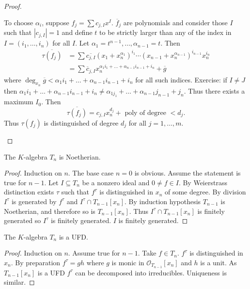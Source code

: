 \documentclass[a4paper]{article}
\renewcommand*{\O}{\mathcal{O}}
\begin{document}
\begin{proof}
\begin{enumerate}
    To choose \(\alpha_i\), suppose \(f_j = \sum c_{j, I} x^I\). \(\overline f_j\) are polynomials and consider those \(I\) such that \(|c_{j, I}| = 1\) and define \(t\) to be strictly larger than any of the index in \(I = (i_1, \dots, i_n)\) for all \(I\). Let \(\alpha_1 = t^{n - 1}, \dots, \alpha_{n - 1} = t\). Then
    \begin{align*}
      \overline{\tau(f_j)}
      &= \sum \overline{c_{j, I}} (x_1 + x_n^{\alpha_1})^{i_1} \cdots (x_{n - 1} + x_n^{\alpha_{n - 1}})^{i_{n - 1}} x_n^{i_n} \\
      &= \sum \overline c_{j, I} x_n^{\alpha_1 i_1 + \dots + \alpha_{n - 1}i_{n - 1} + i_n} + \overline g
    \end{align*}
    where \(\deg_{x_n} \overline g < \alpha_1i_1 + \dots + \alpha_{n - 1} i_{n - 1} + i_n\) for all such indices. Exercise: if \(I \ne J\) then \(\alpha_1i_1 + \dots + \alpha_{n - 1}i_{n - 1} + i_n \ne \alpha_{1 j_1} + \dots + \alpha_{n - 1} j_{n - 1} + j_n\). Thus there exists a maximum \(I_0\). Then
    \[
      \overline{\tau(f_j)} = c_{j, I} x_n^{d_j} + \text{ poly of degree } < d_j.
    \]
    Thus \(\tau(f_j)\) is distinguished of degree \(d_j\) for all \(j = 1, \dots, m\).
  \end{enumerate}
\end{proof}

\begin{proposition}
  The \(K\)-algebra \(T_n\) is Noetherian.
\end{proposition}

\begin{proof}
  Induction on \(n\). The base case \(n = 0\) is obvious. Assume the statement is true for \(n - 1\). Let \(I \subseteq T_n\) be a nonzero ideal and \(0 \ne f \in I\). By Weierstrass distinction exists \(\tau\) such that \(f^\tau\) is distinguished in \(x_n\) of some degree. By division \(I^\tau\) is generated by \(f^\tau\) and \(I^\tau \cap T_{n - 1}[x_n]\). By induction hypothesis \(T_{n - 1}\) is Noetherian, and therefore so is \(T_{n - 1}[x_n]\). Thus \(I^\tau \cap T_{n - 1}[x_n]\) is finitely generated so \(I^\tau\) is finitely generated. \(I\) is finitely generated.
\end{proof}

\begin{proposition}
  The \(K\)-algebra \(T_n\) is a UFD.
\end{proposition}

\begin{proof}
  Induction on \(n\). Assume true for \(n - 1\). Take \(f \in T_n\). \(f^\tau\) is distinguished in \(x_n\). By preparation \(f^\tau = gh\) where \(g\) is monic in \(\O_{T_{n - 1}}[x_n]\) and \(h\) is a unit. As \(T_{n - 1}[x_n]\) is a UFD \(f^\tau\) can be decomposed into irreducibles. Uniqueness is similar.
\end{proof}
\end{document}

